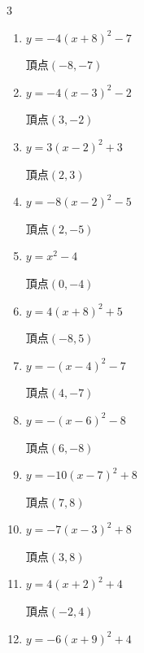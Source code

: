 \begin{multicols}{3}
\begin{enumerate}
        $\displaystyle 頂点\left( 6 , 3 \right)$

  \item $\displaystyle y=-4\left( x+8\right)^{2}-7$

        $\displaystyle 頂点\left( -8 , -7 \right)$

  \item $\displaystyle y=-4\left( x-3\right)^{2}-2$

        $\displaystyle 頂点\left( 3 , -2 \right)$

  \item $\displaystyle y=3\left( x-2\right)^{2}+3$

        $\displaystyle 頂点\left( 2 , 3 \right)$

  \item $\displaystyle y=-8\left( x-2\right)^{2}-5$

        $\displaystyle 頂点\left( 2 , -5 \right)$

  \item $\displaystyle y=x^{2}-4$

        $\displaystyle 頂点\left( 0 , -4 \right)$

  \item $\displaystyle y=4\left( x+8\right)^{2}+5$

        $\displaystyle 頂点\left( -8 , 5 \right)$

  \item $\displaystyle y=-\left( x-4\right)^{2}-7$

        $\displaystyle 頂点\left( 4 , -7 \right)$

  \item $\displaystyle y=-\left( x-6\right)^{2}-8$

        $\displaystyle 頂点\left( 6 , -8 \right)$

  \item $\displaystyle y=-10\left( x-7\right)^{2}+8$

        $\displaystyle 頂点\left( 7 , 8 \right)$

  \item $\displaystyle y=-7\left( x-3\right)^{2}+8$

        $\displaystyle 頂点\left( 3 , 8 \right)$

  \item $\displaystyle y=4\left( x+2\right)^{2}+4$

        $\displaystyle 頂点\left( -2 , 4 \right)$

\columnbreak %

  \item $\displaystyle y=-6\left( x+9\right)^{2}+4$


\end{enumerate}
\end{multicols}
